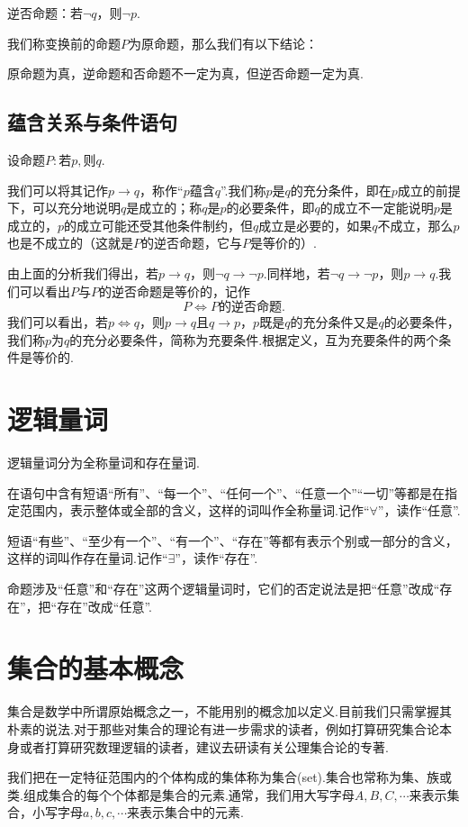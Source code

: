 逆否命题：若$\neg q$，则$\neg p$.

我们称变换前的命题$P$为原命题，那么我们有以下结论：

{\heiti 原命题为真，逆命题和否命题不一定为真，但逆否命题一定为真.}
\subsection{蕴含关系与条件语句}
设命题$P:\text{若}p,\text{则}q$.

我们可以将其记作$p\rightarrow q$，称作“$p$蕴含$q$”.我们称$p$是$q$的{\heiti 充分条件}，即在$p$成立的前提下，可以充分地说明$q$是成立的；称$q$是$p$的{\heiti 必要条件}，即$q$的成立不一定能说明$p$是成立的，$p$的成立可能还受其他条件制约，但$q$成立是必要的，如果$q$不成立，那么$p$也是不成立的（这就是$P$的逆否命题，它与$P$是等价的）.

由上面的分析我们得出，若$p\rightarrow q$，则$\neg q\rightarrow \neg p$.同样地，若$\neg q\rightarrow \neg p$，则$p\rightarrow q$.我们可以看出$P$与$P$的逆否命题是等价的，记作
$$P\iff P\text{的逆否命题}.$$
我们可以看出，若$p\iff q$，则$p\rightarrow q$且$q\rightarrow p$，$p$既是$q$的充分条件又是$q$的必要条件，我们称$p$为$q$的{\heiti 充分必要条件}，简称为{\heiti 充要条件}.根据定义，互为充要条件的两个条件是等价的.
\section{逻辑量词}
逻辑量词分为全称量词和存在量词.
\begin{definition}[全称量词]
	在语句中含有短语“所有”、“每一个”、“任何一个”、“任意一个”“一切”等都是在指定范围内，表示整体或全部的含义，这样的词叫作{\heiti 全称量词}.记作“$\forall$”，读作“任意”.
\end{definition}
\begin{definition}[存在量词]
	短语“有些”、“至少有一个”、“有一个”、“存在”等都有表示个别或一部分的含义，这样的词叫作{\heiti 存在量词}.记作“$\exists$”，读作“存在”.
\end{definition}
命题涉及“任意”和“存在”这两个逻辑量词时，它们的否定说法是把“任意”改成“存在”，把“存在”改成“任意”.
\section{集合的基本概念}
集合是数学中所谓原始概念之一，不能用别的概念加以定义.目前我们只需掌握其朴素的说法.对于那些对集合的理论有进一步需求的读者，例如打算研究集合论本身或者打算研究数理逻辑的读者，建议去研读有关公理集合论的专著.

我们把在一定特征范围内的个体构成的集体称为{\heiti 集合}(set).集合也常称为{\heiti 集}、{\heiti 族}或{\heiti 类}.组成集合的每个个体都是集合的{\heiti 元素}.通常，我们用大写字母$A,B,C,\cdots$来表示集合，小写字母$a,b,c,\cdots$来表示集合中的元素.
